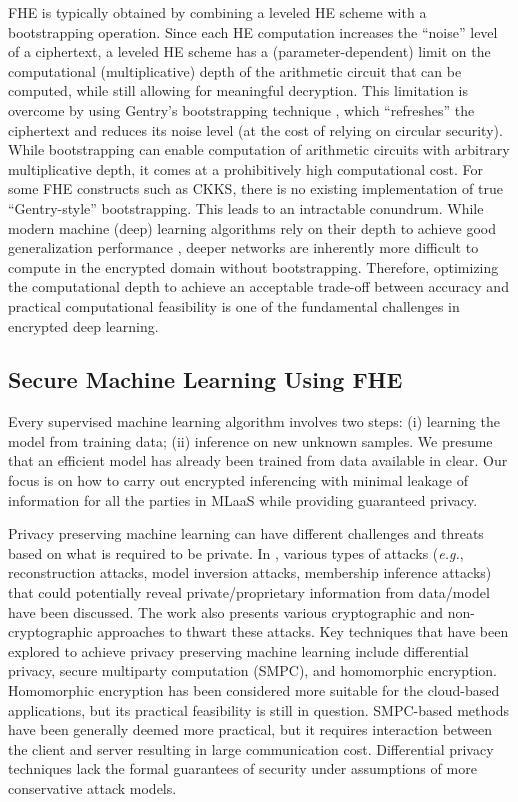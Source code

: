 \documentclass[letterpaper]{article} %
\begin{document}
FHE is typically obtained by combining a leveled HE scheme with a bootstrapping operation. Since each HE computation increases the ``noise'' level of a ciphertext, a leveled HE scheme has a (parameter-dependent) limit on the computational (multiplicative) depth of the arithmetic circuit that can be computed, while still allowing for meaningful decryption. This limitation is overcome by using Gentry’s bootstrapping technique \cite{gentry2009fully}, which ``refreshes'' the ciphertext and reduces its noise level (at the cost of relying on circular security). While bootstrapping can enable computation of arithmetic circuits with arbitrary multiplicative depth, it comes at a prohibitively high computational cost. For some FHE constructs such as CKKS, there is no existing implementation of true ``Gentry-style'' bootstrapping. This leads to an intractable conundrum. While modern machine (deep) learning algorithms rely on their depth to achieve good generalization performance \cite{poggio2017}, deeper networks are inherently more difficult to compute in the encrypted domain without bootstrapping. Therefore, optimizing the computational depth to achieve an acceptable trade-off between accuracy and practical computational feasibility is one of the fundamental challenges in encrypted deep learning.

\subsection{Secure Machine Learning Using FHE}
\label{sec:related}
Every supervised machine learning algorithm involves two steps: (i) learning the model from training data; (ii) inference on new unknown samples. We presume that an efficient model has already been trained from data available in clear. Our focus is on how to carry out encrypted inferencing with minimal leakage of information for all the parties in MLaaS while providing guaranteed privacy.

Privacy preserving machine learning can have different challenges and threats based on what is required to be private. In \cite{ppmlthreats}, various types of attacks (\emph{e.g.}, reconstruction attacks, model inversion attacks, membership inference attacks) that could potentially reveal private/proprietary information from data/model have been discussed. The work also presents various cryptographic and non-cryptographic approaches to thwart these attacks. Key techniques that have been explored to achieve privacy preserving machine learning include differential privacy, secure multiparty computation (SMPC), and homomorphic encryption. Homomorphic encryption has been considered more suitable for the cloud-based applications, but its practical feasibility is still in question. SMPC-based methods have been generally deemed more practical, but it requires interaction between the client and server resulting in large communication cost. Differential privacy techniques lack the formal guarantees of security under assumptions of more conservative attack models.
\end{document}

